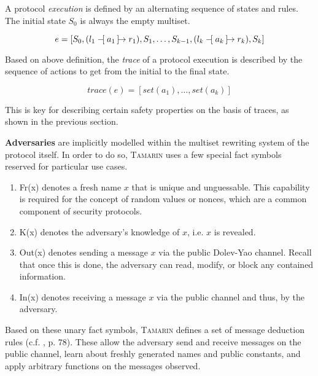 \noindent
A protocol \textit{execution} is defined by an alternating sequence of states and rules. The initial state $S_0$ is always the empty multiset.

\begin{equation}\label{eq:execution}
    e = [S_0, (l_1 \tracerule{a_1} r_1), S_1, \ldots, S_{k-1}, (l_k \tracerule{a_k} r_k), S_k]
\end{equation}

\noindent
Based on above definition, the \textit{trace} of a protocol execution is described by the sequence of actions to get from the initial to the final state.

\begin{equation}
    trace(e) = [set(a_1), \ldots, set(a_k)]
\end{equation}

\noindent
This is key for describing certain safety properties on the basis of traces, as shown in the previous section.

\textbf{Adversaries} are implicitly modelled within the multiset rewriting system of the protocol itself.
In order to do so, \textsc{Tamarin} uses a few special fact symbols reserved for particular use cases.

\begin{enumerate}[label=--]
    \item \textsf{Fr(x)} denotes a fresh name $x$ that is unique and unguessable. This capability is required for the concept of random values or nonces, which are a common component of security protocols.
    \item \textsf{K(x)} denotes the adversary's knowledge of $x$, i.e. $x$ is revealed.
    \item \textsf{Out(x)} denotes sending a message $x$ via the public Dolev-Yao channel. Recall that once this is done, the adversary can read, modify, or block any contained information.
    \item \textsf{In(x)} denotes receiving a message $x$ via the public channel and thus, by the adversary.
\end{enumerate}

\noindent
Based on these unary fact symbols, \textsc{Tamarin} defines a set of message deduction rules (c.f. \cite{meier2013advancing}, p. 78).
These allow the adversary send and receive messages on the public channel, learn about freshly generated names and public constants, and apply arbitrary functions on the messages observed.

